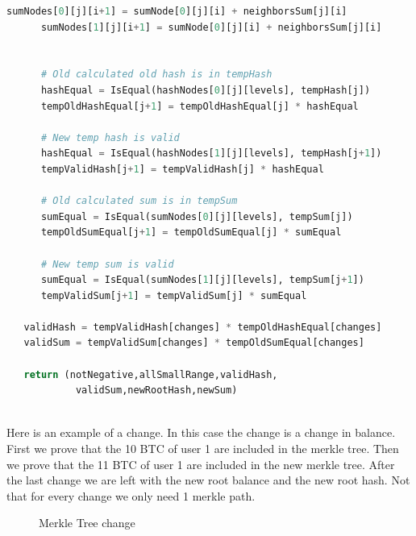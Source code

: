 \begin{lstlisting}[language=Python, caption=Liabilities change circuit pseudocode]
      sumNodes[0][j][i+1] = sumNode[0][j][i] + neighborsSum[j][i]
      sumNodes[1][j][i+1] = sumNode[0][j][i] + neighborsSum[j][i]
         

      # Old calculated old hash is in tempHash
      hashEqual = IsEqual(hashNodes[0][j][levels], tempHash[j])
      tempOldHashEqual[j+1] = tempOldHashEqual[j] * hashEqual

      # New temp hash is valid
      hashEqual = IsEqual(hashNodes[1][j][levels], tempHash[j+1])
      tempValidHash[j+1] = tempValidHash[j] * hashEqual

      # Old calculated sum is in tempSum
      sumEqual = IsEqual(sumNodes[0][j][levels], tempSum[j])
      tempOldSumEqual[j+1] = tempOldSumEqual[j] * sumEqual
      
      # New temp sum is valid
      sumEqual = IsEqual(sumNodes[1][j][levels], tempSum[j+1])
      tempValidSum[j+1] = tempValidSum[j] * sumEqual

   validHash = tempValidHash[changes] * tempOldHashEqual[changes]
   validSum = tempValidSum[changes] * tempOldSumEqual[changes]

   return (notNegative,allSmallRange,validHash, 
            validSum,newRootHash,newSum)
   
\end{lstlisting}

Here is an example of a change. In this case the change is a change in balance. First we prove that the 10 BTC of user 1 are 
included in the merkle tree. Then we prove that the 11 BTC of user 1 are included in the new merkle tree. After the last change we are left
with the new root balance and the new root hash. Not that for every change we only need 1 merkle path.

\begin{figure}
   \hfill
   \hfill
   \hfill
   \caption{Merkle Tree change}
   \end{figure}


